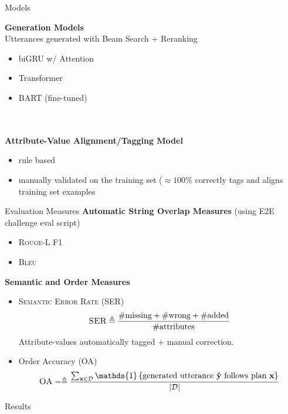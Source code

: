 \begin{frame}{Models}

      \textbf{Generation Models}\\Utterances generated with Beam Search + Reranking
      \begin{itemize}
        \item biGRU w/ Attention
        \item Transformer
        \item BART (fine-tuned)
      \end{itemize}~\\~\\

      

      \textbf{Attribute-Value Alignment/Tagging Model}   
      \begin{itemize}
        \item rule based
        \item manually validated on the training set ($\approx 100\%$ correctly tags and aligns training set examples
      \end{itemize}




\end{frame}

\begin{frame}{Evaluation Measures}
    \textbf{Automatic String Overlap Measures} (using E2E challenge eval script)
    \begin{itemize}
    \item \textsc{Rouge-L} F1
        \item \textsc{Bleu}
    \end{itemize}
    \textbf{Semantic and Order Measures}
    \begin{itemize}
        \item \textsc{Semantic Error Rate (SER)} \[\textsc{SER} \triangleq \frac{\textrm{\#missing} + \textrm{\#wrong} + \textrm{\#added}   }{\textrm{\#attributes}}\]
            Attribute-values automatically tagged + manual correction.
        \item Order Accuracy (OA) \[\textsc{OA} = \triangleq \frac{\sum_{\mathbf{x} \in \mathcal{D}}\mathds{1}\left\{\textrm{generated utterance }\boldsymbol{\hat{\mathbf{y}}} \textrm{ follows plan } \mathbf{x}  \right\}  }{\vert\mathcal{D}\vert }\]
    \end{itemize}
\end{frame}


\begin{frame}{Results}


\end{frame}

